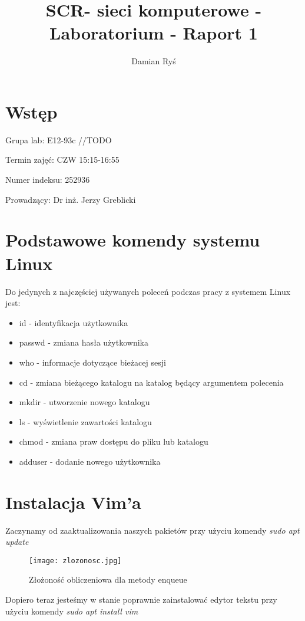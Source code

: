 \documentclass{article}
\title{SCR- sieci komputerowe - Laboratorium - Raport 1}
\author{Damian Ryś}
\begin{document}
\maketitle


\tableofcontents
\section{Wstęp}
\hspace*{0.5cm}Grupa lab: E12-93c	//TODO

Termin zajęć: CZW 15:15-16:55

Numer indeksu: 252936

Prowadzący: Dr inż. Jerzy Greblicki 
\section{Podstawowe komendy systemu Linux}
Do jedynych z najczęściej używanych poleceń podczas pracy z systemem Linux jest:
\begin{itemize}
    \item id - identyfikacja użytkownika
    \item passwd - zmiana hasła użytkownika
    \item who - informacje dotyczące bieżacej sesji
    \item cd - zmiana bieżącego katalogu na katalog będący argumentem polecenia
    \item mkdir - utworzenie nowego katalogu
    \item ls - wyświetlenie zawartości katalogu
    \item chmod - zmiana praw dostępu do pliku lub katalogu
    \item adduser - dodanie nowego użytkownika
\end{itemize}

\section{Instalacja Vim'a}
Zaczynamy od zaaktualizowania naszych pakietów przy użyciu
komendy \textit{sudo apt update}

\begin{figure}[H]
    \centering
    \hspace*{-1cm}
    \texttt{[image: zlozonosc.jpg]}
    \caption{Złożoność obliczeniowa dla metody enqueue}
    \label{2}
\end{figure}

Dopiero teraz jesteśmy w stanie poprawnie zainstalować edytor
tekstu przy użyciu komendy \textit{sudo apt install vim}
\end{document}
